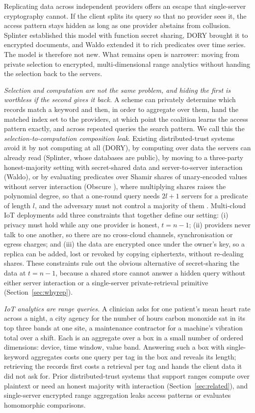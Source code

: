 \documentclass[a4paper,fleqn]{cas-sc}
\begin{document}
Replicating data across independent providers offers an escape that
single-server cryptography cannot. If the client splits its query so that no
provider sees it, the access pattern stays hidden as long as one provider
abstains from collusion. Splinter \citep{splinter} established this model with
function secret sharing, DORY \citep{dory} brought it to encrypted documents,
and Waldo \citep{waldo} extended it to rich predicates over time series. The
model is therefore not new. What remains open is narrower: moving from private
selection to encrypted, multi-dimensional range analytics without handing the
selection back to the servers.

\emph{Selection and computation are not the same problem, and hiding the first
is worthless if the second gives it back.} A scheme can privately determine
which records match a keyword and then, in order to aggregate over them, hand
the matched index set to the providers, at which point the coalition learns
the access pattern exactly, and across repeated queries the search pattern. We
call this the \emph{selection-to-computation composition leak}. Existing
distributed-trust systems avoid it by not computing at all (DORY), by
computing over data the servers can already read (Splinter, whose databases
are public), by moving to a three-party honest-majority setting with
secret-shared data and server-to-server interaction (Waldo), or by
evaluating predicates over Shamir shares of unary-encoded values without server
interaction (Obscure \citep{gupta2019obscure,gupta2020obscure}), where
multiplying shares raises the polynomial degree, so that a one-round query
needs $2l+1$ servers for a predicate of length $l$, and the adversary must not
control a majority of them \citep[\S2.1, \S3.2]{gupta2020obscure}. Multi-cloud IoT deployments add three
constraints that together define our setting: (i) privacy must hold while any
one provider is honest, $t=n-1$; (ii) providers never talk to one another, so
there are no cross-cloud channels, synchronisation or egress charges; and
(iii) the data are encrypted once under the owner's key, so a replica can be
added, lost or revoked by copying ciphertexts, without re-dealing shares.
These constraints rule out the obvious alternative of secret-sharing the data
at $t=n-1$, because a shared store cannot answer a hidden query without either
server interaction or a single-server private-retrieval primitive
(Section~\ref{sec:whyrep}).

\emph{IoT analytics are range queries.} A clinician asks for one patient's
mean heart rate across a night, a city agency for the number of hours carbon
monoxide sat in its top three bands at one site, a maintenance contractor for a
machine's vibration total over a shift. Each is an aggregate over a box in a
small number of ordered dimensions: device, time window, value band. Answering
such a box with single-keyword aggregates costs one query per tag in the box
and reveals its length; retrieving the records first costs a retrieval per tag
and hands the client data it did not ask for. Prior distributed-trust systems
that support ranges compute over plaintext or need an honest majority with
interaction (Section~\ref{sec:related}), and single-server encrypted range
aggregation leaks access patterns or evaluates homomorphic comparisons.
\end{document}
